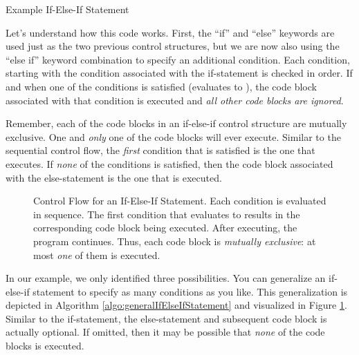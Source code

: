 \begin{algorithm}[H]
\caption{Example If-Else-If Statement}
\label{algo:ifElseIfStatement}
\end{algorithm}

Let's understand how this code works.  First, the ``if'' and ``else'' keywords
are used just as the two previous control structures, but we are now also
using the ``else if'' keyword combination to specify an additional condition.
Each condition, starting with the condition associated with the if-statement 
is checked in order.  If and when one of the conditions is satisfied (evaluates 
to \True), the code block associated with that condition is executed and 
\emph{all other code blocks are ignored}.  

Remember, each of the code blocks in an if-else-if control structure are 
mutually exclusive.  One and \emph{only} one of the code blocks will 
ever execute.  Similar to the sequential control flow, the \emph{first} 
condition that is satisfied is the one that executes.  If \emph{none} of the
conditions is satisfied, then the code block associated with the else-statement
is the one that is executed.   

\begin{figure}
\centering

\caption[Control Flow for an If-Else-If Statement]{Control Flow for an If-Else-If Statement.  Each
condition is evaluated in sequence.  The first condition that evaluates to \True results in
the corresponding code block being executed.  After executing, the program continues.  Thus,
each code block is \emph{mutually exclusive}: at most \emph{one} of them is executed.}
\label{figure:figureIfElseIfFlowChart}
\end{figure}

In our example, we only identified three possibilities.  You can generalize an
if-else-if statement to specify as many conditions as you like.  This generalization
is depicted in Algorithm \ref{algo:generalIfElseIfStatement} and visualized in Figure 
\ref{figure:figureIfElseIfFlowChart}.  Similar to the 
if-statement, the else-statement and subsequent code block is actually optional.  
If omitted, then it may  be possible that \emph{none} of the code blocks is executed.

